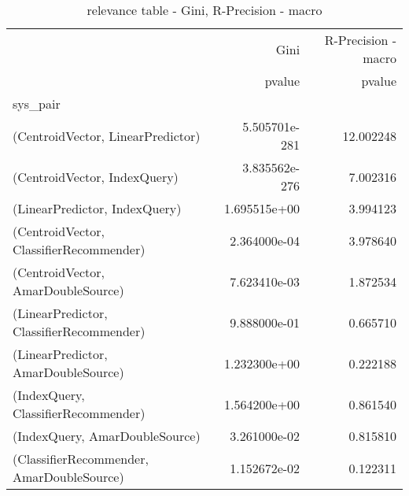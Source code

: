 \documentclass[11pt]{article}
\begin{document}
\begin{table}[H]
\centering
\caption{relevance table - Gini,  R-Precision - macro}
\begin{tabular}{lrr}
\toprule
{} &           Gini &  R-Precision - macro \\
{} &         pvalue &               pvalue \\
sys\_pair                                  &                &                      \\
\midrule
(CentroidVector, LinearPredictor)         &  5.505701e-281 &            12.002248 \\
(CentroidVector, IndexQuery)              &  3.835562e-276 &             7.002316 \\
(LinearPredictor, IndexQuery)             &   1.695515e+00 &             3.994123 \\
(CentroidVector, ClassifierRecommender)   &   2.364000e-04 &             3.978640 \\
(CentroidVector, AmarDoubleSource)        &   7.623410e-03 &             1.872534 \\
(LinearPredictor, ClassifierRecommender)  &   9.888000e-01 &             0.665710 \\
(LinearPredictor, AmarDoubleSource)       &   1.232300e+00 &             0.222188 \\
(IndexQuery, ClassifierRecommender)       &   1.564200e+00 &             0.861540 \\
(IndexQuery, AmarDoubleSource)            &   3.261000e-02 &             0.815810 \\
(ClassifierRecommender, AmarDoubleSource) &   1.152672e-02 &             0.122311 \\
\bottomrule
\end{tabular}
\end{table}
\end{document}
